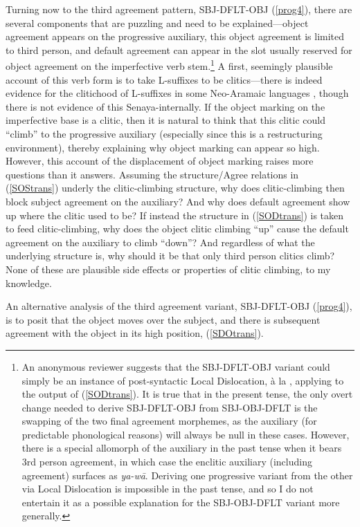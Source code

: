\documentclass[output=paper
,modfonts
,nonflat]{langsci/langscibook}
\begin{document}
Turning now to the third agreement pattern, SBJ-DFLT-OBJ (\ref{prog4}), there are several components that are puzzling and need to be explained---object agreement appears on the progressive auxiliary, this object agreement is limited to third person, and default agreement can appear in the slot usually reserved for object agreement on the imperfective verb stem.\footnote{An anonymous reviewer suggests that the SBJ-DFLT-OBJ variant could simply be an instance of post-syntactic Local Dislocation, \`a la \citet{EmbickNoyer01}, applying to the output of (\ref{SODtrans}). It is true that in the present tense, the only overt change needed to derive SBJ-DFLT-OBJ from SBJ-OBJ-DFLT is the swapping of the two final agreement morphemes, as the auxiliary (for predictable phonological reasons) will always be null in these cases. However, there is a special allomorph of the auxiliary in the past tense when it bears 3rd person agreement, in which case the enclitic auxiliary (including agreement) surfaces as \textit{ya-w\=a}. Deriving one progressive variant from the other via Local Dislocation is impossible in the past tense, and so I do not entertain it as a possible explanation for the SBJ-OBJ-DFLT variant more generally.} A first, seemingly  plausible account of this verb form is to take L-suffixes to be clitics---there is indeed evidence for the clitichood of L-suffixes in some Neo-Aramaic languages \citep{DoronKhan12}, though there is not evidence of this Senaya-internally. If the object marking on the imperfective base is a clitic, then it is natural to think that this clitic could ``climb'' to the progressive auxiliary (especially since this is a restructuring environment), thereby explaining why object marking can appear so high. However, this account of the displacement of object marking raises more questions than it answers. Assuming the structure/Agree relations in (\ref{SOStrans}) underly the clitic-climbing structure, why does clitic-climbing then block subject agreement on the auxiliary? And why does default agreement show up where the clitic used to be? If instead the structure in (\ref{SODtrans}) is taken to feed clitic-climbing, why does the object clitic climbing ``up'' cause the default agreement on the auxiliary to climb ``down''? And regardless of what the underlying structure is, why should it be that only third person clitics climb? None of these are plausible side effects or properties of clitic climbing, to my knowledge.

An alternative analysis of the third agreement variant, SBJ-DFLT-OBJ (\ref{prog4}), is to posit that the object moves over the subject, and there is subsequent agreement with the object in its high position, (\ref{SDOtrans}).
\end{document}
